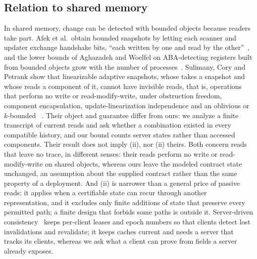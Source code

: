 \subsection{Relation to shared memory}
In shared memory, change can be detected with bounded objects because readers
take part. Afek et al.\ obtain bounded snapshots by letting each scanner and
updater exchange handshake bits, ``each written by one and read by the
other''~\cite{afek1993}, and the lower bounds of Aghazadeh and Woelfel on
ABA-detecting registers built from bounded objects grow with the number of
processes~\cite{aghazadeh2015}. Sulimany, Cory and Petrank show that
linearizable adaptive snapshots, whose  takes a snapshot and whose
 reads a component of it, cannot have invisible reads, that is,
 operations that perform no write or read-modify-write, under
obstruction freedom, component encapsulation, update-linearization
independence and an oblivious or $k$-bounded ~\cite{sulimany2026}.
Their object and guarantee differ from ours: we analyze a finite transcript of
current reads and ask whether a combination existed in every compatible
history, and our bound counts server states rather than accessed components.
Their result does not imply (ii), nor (ii) theirs. Both concern reads that
leave no trace, in different senses: their reads perform no write or
read-modify-write on shared objects, whereas ours leave the modeled contract
state unchanged, an assumption about the supplied contract rather than the
same property of a deployment. And (ii) is narrower than a general price of
passive reads: it applies when a certifiable state can recur through another
representation, and it excludes only finite additions of state that preserve
every permitted path; a finite design that forbids some paths is outside it. Server-driven consistency~\cite{yin2001} keeps per-client leases and
epoch numbers so that clients detect lost invalidations and revalidate; it
keeps caches current and needs a server that tracks its clients, whereas we
ask what a client can prove from fields a server already exposes.

